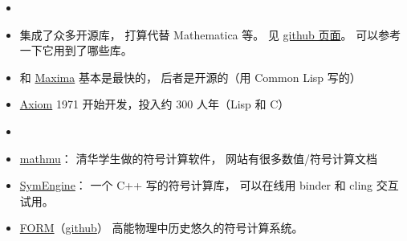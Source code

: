 
\begin{issues}
\issueDraft
\end{issues}

\begin{itemize}
\item {}
\item {} 集成了众多开源库， 打算代替 Mathematica 等。 见 \href{https://github.com/sagemath/sage/}{github 页面}。 可以参考一下它用到了哪些库。
\item  {} 和 \href{https://maxima.sourceforge.io/}{Maxima} 基本是最快的， 后者是开源的（用 Common Lisp 写的）
\item \href{http://www.axiom-developer.org/}{Axiom} 1971 开始开发，投入约 300 人年（Lisp 和 C）
\item {}
\item \href{http://mathmu.github.io/MTCAS/RecentChanges.html}{mathmu}： 清华学生做的符号计算软件， 网站有很多数值/符号计算文档
\item \href{https://github.com/symengine/symengine}{SymEngine}： 一个 C++ 写的符号计算库， 可以在线用 binder 和 cling 交互试用。
\item \href{https://www.nikhef.nl/~form/}{FORM}（\href{https://github.com/vermaseren/form}{github}） 高能物理中历史悠久的符号计算系统。
\end{itemize}
